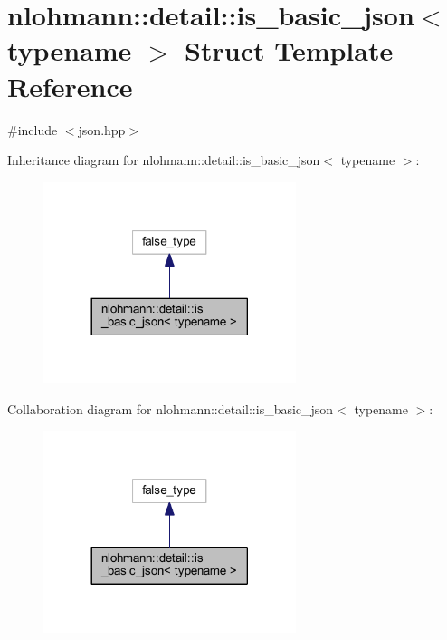 \hypertarget{structnlohmann_1_1detail_1_1is__basic__json}{}\section{nlohmann\+::detail\+::is\+\_\+basic\+\_\+json$<$ typename $>$ Struct Template Reference}
\label{structnlohmann_1_1detail_1_1is__basic__json}


{\ttfamily \#include $<$json.\+hpp$>$}



Inheritance diagram for nlohmann\+::detail\+::is\+\_\+basic\+\_\+json$<$ typename $>$\+:
\nopagebreak
\begin{figure}[H]
\begin{center}
\leavevmode
\includegraphics[width=209pt]{structnlohmann_1_1detail_1_1is__basic__json__inherit__graph}
\end{center}
\end{figure}


Collaboration diagram for nlohmann\+::detail\+::is\+\_\+basic\+\_\+json$<$ typename $>$\+:
\nopagebreak
\begin{figure}[H]
\begin{center}
\leavevmode
\includegraphics[width=209pt]{structnlohmann_1_1detail_1_1is__basic__json__coll__graph}
\end{center}
\end{figure}


